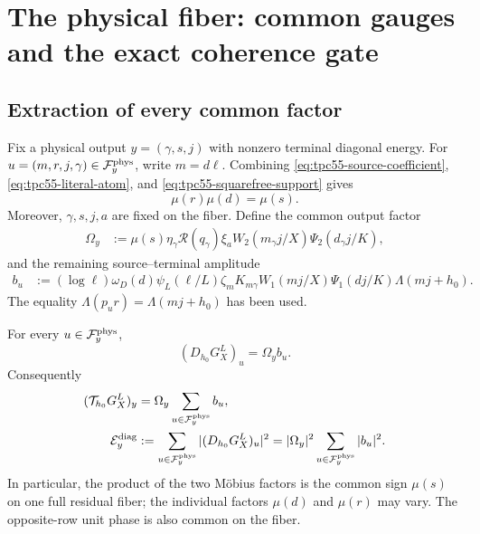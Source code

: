 \section{The physical fiber: common gauges and the exact coherence gate}
\label{sec:physical-coherence}

\subsection{Extraction of every common factor}

Fix a physical output \(y=(\gamma,s,j)\) with nonzero terminal diagonal
energy.  For \(u=(m,r,j,\gamma)\in\mathcal F_y^{\rm phys}\), write
\(m=d\ell\).  Combining
\eqref{eq:tpc55-source-coefficient},
\eqref{eq:tpc55-literal-atom}, and
\eqref{eq:tpc55-squarefree-support} gives
\begin{equation}
 \mu(r)\mu(d)=\mu(s).
 \label{eq:tpc55-common-mobius-gauge}
\end{equation}
Moreover, \(\gamma,s,j,a\) are fixed on the fiber.  Define the common
output factor
\begin{align}
 \Omega_y
 &:={}
 \mu(s)\eta_\gamma\mathscr R(q_\gamma)\xi_a
 W_2(m_\gamma j/X)\Psi_2(d_\gamma j/K),
 \label{eq:tpc55-common-output-factor}
\end{align}
and the remaining source--terminal amplitude
\begin{align}
 b_u
 &:={}
 (\log\ell)\omega_D(d)\psi_L(\ell/L)\zeta_m
 K_{m\gamma}
 W_1(mj/X)\Psi_1(dj/K)
 \Lambda(mj+h_0).
 \label{eq:tpc55-remaining-fiber-amplitude}
\end{align}
The equality \(\Lambda(p_ur)=\Lambda(mj+h_0)\) has been used.

\begin{proposition}
\label{prop:tpc55-physical-gauge-factorization}
For every \(u\in\mathcal F_y^{\rm phys}\),
\begin{equation}
 (D_{h_0}G_X^L)_u=\Omega_y b_u.
 \label{eq:tpc55-terminalized-factorization}
\end{equation}
Consequently
\begin{align}
 (\mathcal T_{h_0}G_X^L)_y
 &=\Omega_y\sum_{u\in\mathcal F_y^{\rm phys}}b_u,
 \label{eq:tpc55-physical-fiber-sum}\\
 \mathcal E_y^{\rm diag}
 &:=\sum_{u\in\mathcal F_y^{\rm phys}}|(D_{h_0}G_X^L)_u|^2
 =|\Omega_y|^2\sum_{u\in\mathcal F_y^{\rm phys}}|b_u|^2.
 \label{eq:tpc55-physical-fiber-diagonal}
\end{align}
In particular, the product of the two M\"obius factors is the common sign
\(\mu(s)\) on one full residual fiber; the individual factors
\(\mu(d)\) and \(\mu(r)\) may vary.  The opposite-row unit phase is also
common on the fiber.
\end{proposition}


